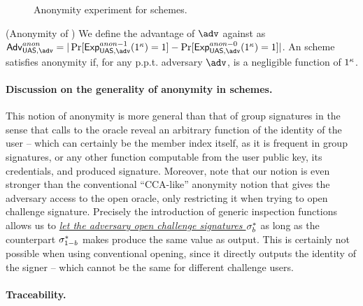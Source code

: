 \begin{figure}[htp!]
  \caption{Anonymity experiment for \UAS schemes.}
  \label{fig:exp-uas-anonb}
\end{figure}

\begin{definition}{(Anonymity of \UAS)}
  We define the advantage \AdvAnon of $\adv$ against \ExpAnonb as
  $\AdvAnon=|\Pr\lbrack\ExpAnono(1^\secpar)=1\rbrack-
  \Pr\lbrack\ExpAnonz(1^\secpar)=1\rbrack|$.
  An \UAS scheme satisfies anonymity if, for any p.p.t. adversary $\adv$,
  \AdvAnon is a negligible function of $1^\kappa$.
\end{definition}

\paragraph{Discussion on the generality of anonymity in \UAS schemes.} %
This notion of anonymity is more general than that of group signatures in the
sense that calls to the \INSPECT oracle reveal an arbitrary function of the
identity of the user -- which can certainly be the member index itself, as it
is frequent in group signatures, or any other function computable from the
user public key, its credentials, and produced signature. Moreover, note that
our notion is even stronger than the conventional ``CCA-like'' anonymity notion
that gives the adversary access to the open oracle, only restricting it when
trying to open challenge signature. Precisely the introduction of generic
inspection functions allows us to \uline{\emph{let the adversary open
    challenge signatures $\mathsf{\sigma}^*_b$}} as long as the counterpart $\mathsf{\sigma}^*_{1-b}$
makes \Inspect produce the same \y value as output. This is certainly not
possible when using conventional opening, since it directly outputs the identity
of the signer -- which cannot be the same for different challenge users.

\paragraph{Traceability.} %

